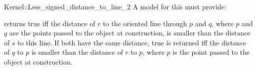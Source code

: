 \begin{ccRefFunctionObjectConcept}{Kernel::Less_signed_distance_to_line_2}
A model for this must provide:


{}
 
{returns true iff the distance of $r$ to the oriented line 
through $p$ and $q$, where $p$ and $q$ are the points passed
to the object at construction, is smaller than the distance of
$s$ to this line. If both have the same distance, true is
returned iff the distance of $q$ to $p$ is
smaller than the distance of $r$ to $p$, where $p$ is the point
passed to the object at construction.}

\end{ccRefFunctionObjectConcept}
